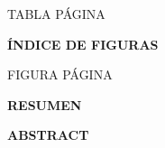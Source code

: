 \documentclass[12pt]{article}
\begin{document}
\begin{flushright} \small
TABLA \hspace{11.6cm} PÁGINA\\
\end{flushright}

\vspace{-1.0cm}

\begin{spacing}{1.2}
{\fontsize{10}{10}\selectfont \listoftables}
\end{spacing}

\newpage

\begin{center}
{\fontsize{14}{14}\selectfont \bf ÍNDICE DE FIGURAS}\\
\end{center}
{}


\begin{flushright} \small
FIGURA \hspace{11.45cm} PÁGINA\\
\end{flushright}

\vspace{-1.0cm}

\begin{spacing}{1.2}
{\fontsize{10}{10}\selectfont \listoffigures}
\end{spacing}

\newpage


\begin{center}
{\fontsize{14}{14}\selectfont \bf RESUMEN}\\
\end{center}
{}



\newpage

\begin{center}
{\fontsize{14}{14}\selectfont \bf ABSTRACT}\\
\end{center}
{}

%

\newpage
\end{document}
